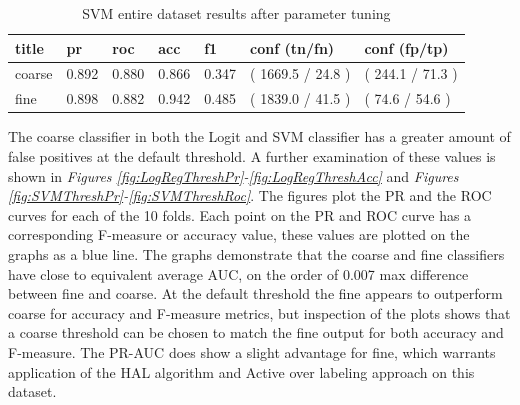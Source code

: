 \documentclass[ms]{nuthesis}
\begin{document}
\FloatBarrier
\begin{table}[H]
\centering
\caption{SVM entire dataset results after parameter tuning}
\label{tab:SVM-All}
\begin{tabular}{|l||l||l||l||l||l||l|}\toprule
title & pr & roc & acc & f1 & conf (tn/fn) & conf (fp/tp) \\ \midrule
coarse & 0.892 & 0.880 & 0.866 & 0.347 & ( 1669.5 / 24.8 ) & ( 244.1 / 71.3 ) \\
fine & 0.898 & 0.882 & 0.942 & 0.485 & ( 1839.0 / 41.5 ) & ( 74.6 / 54.6 ) \\ \bottomrule
\end{tabular}
\end{table}
\FloatBarrier

\par The coarse classifier in both the Logit and SVM classifier has a greater
 amount of false positives at the default threshold. A further examination of these
 values is shown in \textit{Figures \ref{fig:LogRegThreshPr}-\ref{fig:LogRegThreshAcc}}
  and \textit{Figures \ref{fig:SVMThreshPr}-\ref{fig:SVMThreshRoc}}. The figures plot the PR and the ROC
 curves for each of the 10 folds. Each point on the PR and ROC curve has a
 corresponding F-measure or accuracy value, these values are plotted on the graphs
 as a blue line. The graphs demonstrate that the coarse and fine classifiers have close
 to equivalent average AUC, on the order of 0.007 max difference between fine and coarse.
  At the default threshold the fine appears to outperform coarse for accuracy and F-measure
  metrics, but inspection of the plots shows that a coarse threshold can be chosen to match the fine output for
 both accuracy and F-measure. The PR-AUC does show a slight advantage for fine,
 which warrants application of the HAL algorithm and Active over labeling approach on this dataset.
\end{document}
